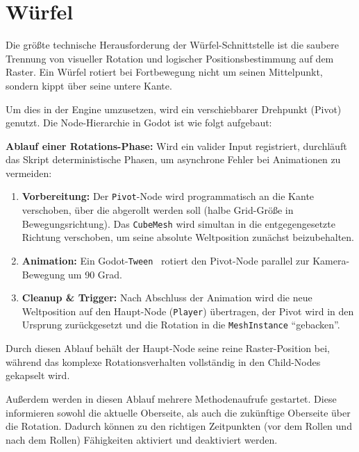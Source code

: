 \documentclass[oneside]{ausarbeitung}
\begin{document}
\section{Würfel}

Die größte technische Herausforderung der Würfel-Schnittstelle ist die saubere Trennung von visueller Rotation und logischer Positionsbestimmung auf dem Raster. Ein Würfel rotiert bei Fortbewegung nicht um seinen Mittelpunkt, sondern kippt über seine untere Kante. 

Um dies in der Engine umzusetzen, wird ein verschiebbarer Drehpunkt (Pivot) genutzt. Die Node-Hierarchie in Godot ist wie folgt aufgebaut:\\


\textbf{Ablauf einer Rotations-Phase:}
Wird ein valider Input registriert, durchläuft das Skript deterministische Phasen, um asynchrone Fehler bei Animationen zu vermeiden:

\begin{enumerate}
    \item \textbf{Vorbereitung:} Der \texttt{Pivot}-Node wird programmatisch an die Kante verschoben, über die abgerollt werden soll (halbe Grid-Größe in Bewegungsrichtung). Das \texttt{CubeMesh} wird simultan in die entgegengesetzte Richtung verschoben, um seine absolute Weltposition zunächst beizubehalten.
    \item \textbf{Animation:} Ein Godot-\texttt{Tween}~\cite{godot:tween} rotiert den Pivot-Node parallel zur Kamera-Bewegung um 90 Grad.
    \item \textbf{Cleanup \& Trigger:} Nach Abschluss der Animation wird die neue Weltposition auf den Haupt-Node (\texttt{Player}) übertragen, der Pivot wird in den Ursprung zurückgesetzt und die Rotation in die \texttt{MeshInstance} \enquote{gebacken}.
\end{enumerate}

Durch diesen Ablauf behält der Haupt-Node seine reine Raster-Position bei, während das komplexe Rotationsverhalten vollständig in den Child-Nodes gekapselt wird.

Außerdem werden in diesen Ablauf mehrere Methodenaufrufe gestartet. Diese informieren sowohl die aktuelle Oberseite, als auch die zukünftige Oberseite über die Rotation. Dadurch können zu den richtigen Zeitpunkten (vor dem Rollen und nach dem Rollen) Fähigkeiten aktiviert und deaktiviert werden.
\end{document}
